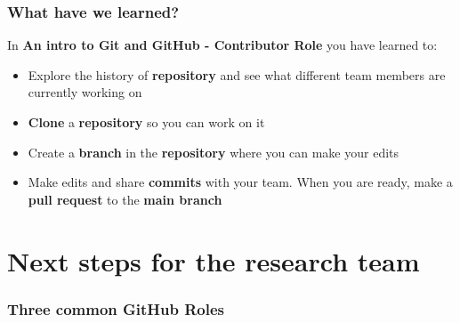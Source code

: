 \documentclass[aspectratio=169]{beamer} %
\begin{document}
%
%
%

\begin{frame}
\frametitle{What have we learned?}

	In \textbf{An intro to Git and GitHub - Contributor Role} you have learned to:

	\begin{itemize}
		\item Explore the history of \textbf{repository} and see what different team members are currently working on
		\item \textbf{Clone} a \textbf{repository} so you can work on it
		\item Create a \textbf{branch} in the \textbf{repository} where you can make your edits
		\item Make edits and share \textbf{commits} with your team. When you are ready, make a \textbf{pull request} to the \textbf{main branch}
	\end{itemize}
\end{frame}


\section{Next steps for the research team}

\begin{frame}
\frametitle{Three common GitHub Roles}

	

\end{frame}
\end{document}
